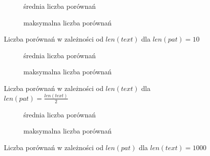 \begin{figure}[htb]
    \centering
    \begin{subfigure}[b]{0.49\textwidth}
        \centering
        
        \caption{średnia liczba porównań}
        \label{fig:result_natural_pat_10_plot_avg_100}
    \end{subfigure}
    \hfill
    \begin{subfigure}[b]{0.49\textwidth}
        \centering
        
        \caption{maksymalna liczba porównań}
        \label{fig:result_natural_pat_10_plot_max_100}
    \end{subfigure}
    \hfill
    \caption{Liczba porównań w zależności od $len(text)$ dla $len(pat) = 10$}
    \label{fig:result_natural_pat_10}
\end{figure}

\begin{figure}[htb]
    \centering
    \begin{subfigure}[b]{0.49\textwidth}
        \centering
        
        \caption{średnia liczba porównań}
        \label{fig:result_natural_pat_len(text)2_plot_avg_100}
    \end{subfigure}
    \hfill
    \begin{subfigure}[b]{0.49\textwidth}
        \centering
        
        \caption{maksymalna liczba porównań}
        \label{fig:result_natural_pat_len(text)2_plot_max_100}
    \end{subfigure}
    \hfill
    \caption{Liczba porównań w zależności od $len(text)$ dla $len(pat) = \frac{len(text)}{2}$}
    \label{fig:result_natural_pat_len(text)2}
\end{figure}

\begin{figure}[htb]
    \centering
    \begin{subfigure}[b]{0.49\textwidth}
        \centering
        
        \caption{średnia liczba porównań}
        \label{fig:result_natural_text_1000_plot_avg_100}
    \end{subfigure}
    \hfill
    \begin{subfigure}[b]{0.49\textwidth}
        \centering
        
        \caption{maksymalna liczba porównań}
        \label{fig:result_natural_text_1000_plot_max_100}
    \end{subfigure}
    \hfill
    \caption{Liczba porównań w zależności od $len(pat)$ dla $len(text) = 1000$}
    \label{fig:result_natural_text_1000}
\end{figure}


